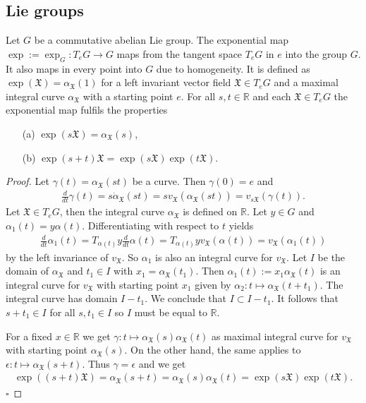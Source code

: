 \documentclass[envcountsect,runningheads]{llncs}
\renewcommand{\qed}{\hfill$\square$}
\begin{document}
\subsection{Lie groups}
\begin{definition}
Let $G$ be a commutative abelian Lie group. The exponential map $\exp := \exp_G : T_eG \rightarrow G$ maps from the tangent space $T_eG$ in $e$ into the group $G$. It also maps in every point into $G$ due to homogeneity. It is defined as $\exp(\mathfrak{X}) = \alpha_{\mathfrak{X}} (1)$ for a left invariant vector field $\mathfrak{X} \in T_eG$ and a maximal integral curve $\alpha_{\mathfrak{X}}$ with a starting point $e$. For all $s,t \in \mathbb{R}$ and each $\mathfrak{X} \in T_eG$ the exponential map fulfils the properties
\begin{itemize}
	\item[(a)] $\exp(s\mathfrak{X}) = \alpha_{\mathfrak{X}}(s)$,
	\item[(b)] $\exp(s+t) \mathfrak{X} = \exp(s\mathfrak{X}) \exp(t \mathfrak{X})$.
\end{itemize}
\end{definition}

\begin{proof}
Let $\gamma(t) = \alpha_{\mathfrak{X}}(st)$ be a curve. Then $\gamma(0) = e$ and
\begin{align}
	\frac{d}{dt}\gamma(t) = s\dot{\alpha}_{\mathfrak{X}}(st) = s v_{\mathfrak{X}}(\alpha_{\mathfrak{X}}(st)) = v_{s\mathfrak{X}}(\gamma(t)).
\end{align}
Let $\mathfrak{X} \in T_eG$, then the integral curve $\alpha_{\mathfrak{X}}$ is defined on $\mathbb{R}$. Let $y \in G$ and $\alpha_1(t) = y\alpha(t)$. Differentiating with respect to $t$ yields
\begin{align}
	\frac{d}{dt}\alpha_{1}(t) = T_{\alpha(t)}y \frac{d}{dt} \alpha(t) = T_{\alpha(t)} y v_{\mathfrak{X}}(\alpha(t)) = v_{\mathfrak{X}}(\alpha_1(t))
\end{align}
by the left invariance of $v_{\mathfrak{X}}$. So $\alpha_1$ is also an integral curve for $v_{\mathfrak{X}}$. Let $I$ be the domain of $\alpha_{\mathfrak{X}}$ and $t_1 \in I$ with $x_1 = \alpha_{\mathfrak{X}}(t_1)$. Then $\alpha_1(t) := x_1 \alpha_{\mathfrak{X}}(t)$ is an integral curve for $v_{\mathfrak{X}}$ with starting point $x_1$ given by $\alpha_2: t \mapsto \alpha_{\mathfrak{X}}(t+t_1)$. The integral curve has domain $I-t_1$. We conclude that $I \subset I-t_1$. It follows that $s+t_1 \in I$ for all $s, t_1 \in I$ so $I$ must be equal to $\mathbb{R}$.

For a fixed $x \in \mathbb{R}$ we get $\gamma: t \mapsto \alpha_{\mathfrak{X}}(s)\alpha_{\mathfrak{X}}(t)$ as maximal integral curve for $v_{\mathfrak{X}}$ with starting point $\alpha_{\mathfrak{X}}(s)$. On the other hand, the same applies to $\epsilon: t \mapsto \alpha_{\mathfrak{X}}(s+t)$. Thus $\gamma = \epsilon$ and we get
\begin{align}
	\exp((s+t)\mathfrak{X}) = \alpha_{\mathfrak{X}}(s+t) = \alpha_{\mathfrak{X}}(s) \alpha_{\mathfrak{X}}(t) = \exp(s\mathfrak{X}) \exp(t\mathfrak{X}).
\end{align} \qed
\end{proof}
\end{document}
